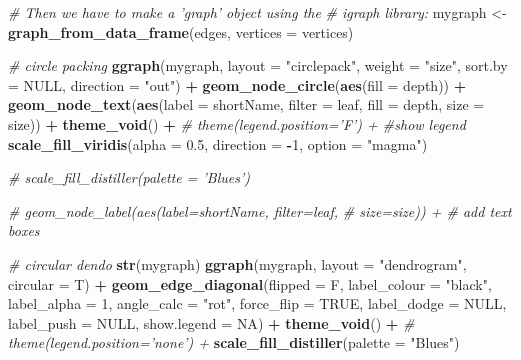 \documentclass[10,portrait]{article}
\newenvironment{Shaded}{\begin{snugshade}}{\end{snugshade}}
\newcommand{\KeywordTok}[1]{\textcolor[rgb]{0.13,0.29,0.53}{\textbf{#1}}}
\newcommand{\DataTypeTok}[1]{\textcolor[rgb]{0.13,0.29,0.53}{#1}}
\newcommand{\DecValTok}[1]{\textcolor[rgb]{0.00,0.00,0.81}{#1}}
\newcommand{\FloatTok}[1]{\textcolor[rgb]{0.00,0.00,0.81}{#1}}
\newcommand{\StringTok}[1]{\textcolor[rgb]{0.31,0.60,0.02}{#1}}
\newcommand{\CommentTok}[1]{\textcolor[rgb]{0.56,0.35,0.01}{\textit{#1}}}
\newcommand{\OtherTok}[1]{\textcolor[rgb]{0.56,0.35,0.01}{#1}}
\newcommand{\OperatorTok}[1]{\textcolor[rgb]{0.81,0.36,0.00}{\textbf{#1}}}
\newcommand{\NormalTok}[1]{#1}
\begin{document}
\begin{Shaded}
\begin{Highlighting}[]
{{{\CommentTok{# Then we have to make a 'graph' object using the}
\CommentTok{# igraph library:}
\NormalTok{mygraph <-}\StringTok{ }\KeywordTok{graph_from_data_frame}\NormalTok{(edges, }\DataTypeTok{vertices =}\NormalTok{ vertices)}

\CommentTok{# circle packing}
\KeywordTok{ggraph}\NormalTok{(mygraph, }\DataTypeTok{layout =} \StringTok{"circlepack"}\NormalTok{, }\DataTypeTok{weight =} \StringTok{"size"}\NormalTok{, }
    \DataTypeTok{sort.by =} \OtherTok{NULL}\NormalTok{, }\DataTypeTok{direction =} \StringTok{"out"}\NormalTok{) }\OperatorTok{+}\StringTok{ }\KeywordTok{geom_node_circle}\NormalTok{(}\KeywordTok{aes}\NormalTok{(}\DataTypeTok{fill =}\NormalTok{ depth)) }\OperatorTok{+}\StringTok{ }
\StringTok{    }\KeywordTok{geom_node_text}\NormalTok{(}\KeywordTok{aes}\NormalTok{(}\DataTypeTok{label =}\NormalTok{ shortName, }\DataTypeTok{filter =}\NormalTok{ leaf, }
        \DataTypeTok{fill =}\NormalTok{ depth, }\DataTypeTok{size =}\NormalTok{ size)) }\OperatorTok{+}\StringTok{ }\KeywordTok{theme_void}\NormalTok{() }\OperatorTok{+}\StringTok{ }
\StringTok{    }\CommentTok{# theme(legend.position='F') + #show legend}
\KeywordTok{scale_fill_viridis}\NormalTok{(}\DataTypeTok{alpha =} \FloatTok{0.5}\NormalTok{, }\DataTypeTok{direction =} \OperatorTok{-}\DecValTok{1}\NormalTok{, }\DataTypeTok{option =} \StringTok{"magma"}\NormalTok{)}

\CommentTok{# scale_fill_distiller(palette = 'Blues')}

\CommentTok{# geom_node_label(aes(label=shortName, filter=leaf,}
\CommentTok{# size=size)) + # add text boxes}

\CommentTok{# circular dendo}
\KeywordTok{str}\NormalTok{(mygraph)}
\KeywordTok{ggraph}\NormalTok{(mygraph, }\DataTypeTok{layout =} \StringTok{"dendrogram"}\NormalTok{, }\DataTypeTok{circular =}\NormalTok{ T) }\OperatorTok{+}\StringTok{ }
\StringTok{    }\KeywordTok{geom_edge_diagonal}\NormalTok{(}\DataTypeTok{flipped =}\NormalTok{ F, }\DataTypeTok{label_colour =} \StringTok{"black"}\NormalTok{, }
        \DataTypeTok{label_alpha =} \DecValTok{1}\NormalTok{, }\DataTypeTok{angle_calc =} \StringTok{"rot"}\NormalTok{, }\DataTypeTok{force_flip =} \OtherTok{TRUE}\NormalTok{, }
        \DataTypeTok{label_dodge =} \OtherTok{NULL}\NormalTok{, }\DataTypeTok{label_push =} \OtherTok{NULL}\NormalTok{, }\DataTypeTok{show.legend =} \OtherTok{NA}\NormalTok{) }\OperatorTok{+}\StringTok{ }
\StringTok{    }\KeywordTok{theme_void}\NormalTok{() }\OperatorTok{+}\StringTok{ }\CommentTok{# theme(legend.position='none') +}
\KeywordTok{scale_fill_distiller}\NormalTok{(}\DataTypeTok{palette =} \StringTok{"Blues"}\NormalTok{)}

}}}
\end{Highlighting}
\end{Shaded}
\end{document}
